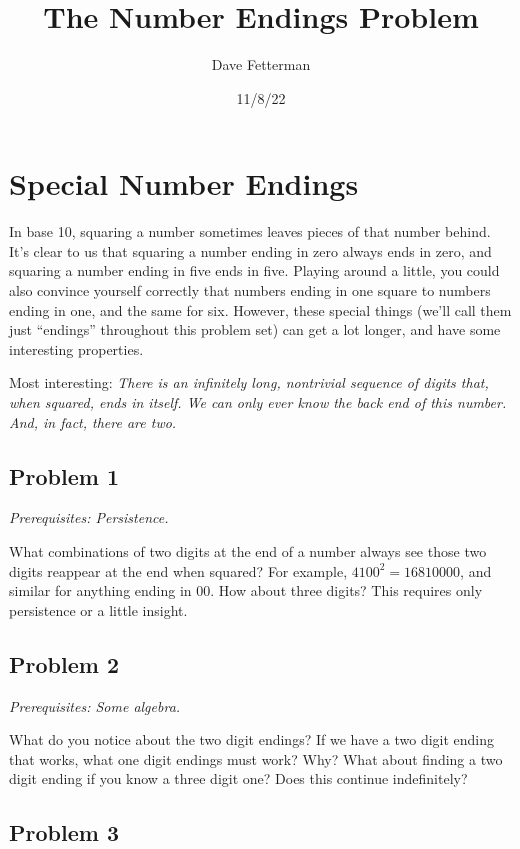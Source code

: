 \documentclass[11pt, oneside]{article} 	%
\title{The Number Endings Problem}
\author{Dave Fetterman}
\affil{Obviously Unemployed}
\date{11/8/22}
\begin{document}
\maketitle

\section{Special Number Endings}

In base 10, squaring a number sometimes leaves pieces of that number behind.  It's clear to us that squaring a number ending in zero always ends in zero, and squaring a number ending in five ends in five.  Playing around a little, you could also convince yourself correctly that numbers ending in one square to numbers ending in one, and the same for six.  However, these special things (we'll call them just ``endings'' throughout this problem set) can get a lot longer, and have some interesting properties.

Most interesting: \emph{There is an infinitely long, nontrivial sequence of digits that, when squared, ends in itself.  We can only ever know the back end of this number.  And, in fact, there are two.}

\subsection{Problem 1} 

\emph{Prerequisites: Persistence.}

What combinations of two digits at the end of a number always see those two digits reappear at the end when squared?  For example, $4100^2 = 16810000$, and similar for anything ending in 00.  How about three digits? This requires only persistence or a little insight.

\subsection{Problem 2} 

\emph{Prerequisites: Some algebra.}

What do you notice about the two digit endings?  If we have a two digit ending that works, what one digit endings must work?  Why?  What about finding a two digit ending if you know a three digit one?  Does this continue indefinitely?

\subsection{Problem 3} 
\end{document}
